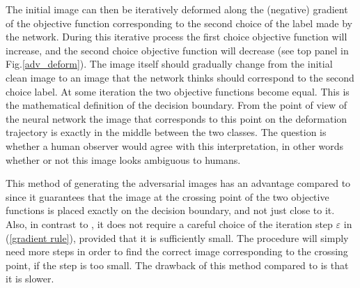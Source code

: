 The initial image can then be iteratively deformed along the (negative) gradient of the objective function corresponding to the second choice of the label made by the network. During this iterative process the first choice objective function will increase, and the second choice objective function will decrease (see top panel in Fig.\ref{adv_deform}). The image itself should gradually change from the initial clean image to an image that the network thinks should correspond to the second choice label. At some iteration the two objective functions become equal. This is the mathematical definition of the decision boundary. From the point of view of the neural network the image that corresponds to this point on the deformation trajectory is exactly in the middle between the two classes. The question is whether a human observer would agree with this interpretation, in other words whether or not this image looks ambiguous to humans. 

 This method of generating the adversarial images has an advantage compared to \cite{sign gradient} since it guarantees that the image at the crossing point of the two objective functions is placed exactly on the decision boundary, and not just close to it. Also, in contrast to \cite{sign gradient}, it does not require a careful choice of the iteration step $\varepsilon$ in (\ref{gradient rule}), provided that it is sufficiently small. The procedure will simply need more steps in order to find the correct image corresponding to the crossing point, if the step is too small. The drawback of this method compared to \cite{sign gradient} is that it is slower. 

